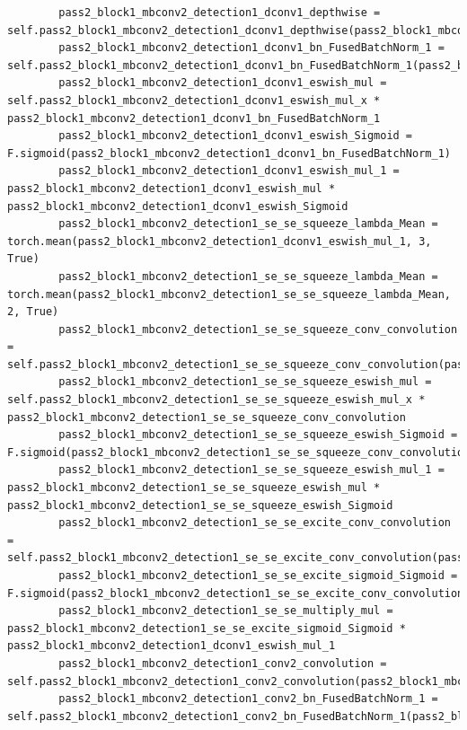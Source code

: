 \documentclass{fisatprojectfinal}
\begin{document}
\begin{appendices}
\begin{lstlisting}
        pass2_block1_mbconv2_detection1_dconv1_depthwise = self.pass2_block1_mbconv2_detection1_dconv1_depthwise(pass2_block1_mbconv2_detection1_dconv1_depthwise_pad)
        pass2_block1_mbconv2_detection1_dconv1_bn_FusedBatchNorm_1 = self.pass2_block1_mbconv2_detection1_dconv1_bn_FusedBatchNorm_1(pass2_block1_mbconv2_detection1_dconv1_depthwise)
        pass2_block1_mbconv2_detection1_dconv1_eswish_mul = self.pass2_block1_mbconv2_detection1_dconv1_eswish_mul_x * pass2_block1_mbconv2_detection1_dconv1_bn_FusedBatchNorm_1
        pass2_block1_mbconv2_detection1_dconv1_eswish_Sigmoid = F.sigmoid(pass2_block1_mbconv2_detection1_dconv1_bn_FusedBatchNorm_1)
        pass2_block1_mbconv2_detection1_dconv1_eswish_mul_1 = pass2_block1_mbconv2_detection1_dconv1_eswish_mul * pass2_block1_mbconv2_detection1_dconv1_eswish_Sigmoid
        pass2_block1_mbconv2_detection1_se_se_squeeze_lambda_Mean = torch.mean(pass2_block1_mbconv2_detection1_dconv1_eswish_mul_1, 3, True)
        pass2_block1_mbconv2_detection1_se_se_squeeze_lambda_Mean = torch.mean(pass2_block1_mbconv2_detection1_se_se_squeeze_lambda_Mean, 2, True)
        pass2_block1_mbconv2_detection1_se_se_squeeze_conv_convolution = self.pass2_block1_mbconv2_detection1_se_se_squeeze_conv_convolution(pass2_block1_mbconv2_detection1_se_se_squeeze_lambda_Mean)
        pass2_block1_mbconv2_detection1_se_se_squeeze_eswish_mul = self.pass2_block1_mbconv2_detection1_se_se_squeeze_eswish_mul_x * pass2_block1_mbconv2_detection1_se_se_squeeze_conv_convolution
        pass2_block1_mbconv2_detection1_se_se_squeeze_eswish_Sigmoid = F.sigmoid(pass2_block1_mbconv2_detection1_se_se_squeeze_conv_convolution)
        pass2_block1_mbconv2_detection1_se_se_squeeze_eswish_mul_1 = pass2_block1_mbconv2_detection1_se_se_squeeze_eswish_mul * pass2_block1_mbconv2_detection1_se_se_squeeze_eswish_Sigmoid
        pass2_block1_mbconv2_detection1_se_se_excite_conv_convolution = self.pass2_block1_mbconv2_detection1_se_se_excite_conv_convolution(pass2_block1_mbconv2_detection1_se_se_squeeze_eswish_mul_1)
        pass2_block1_mbconv2_detection1_se_se_excite_sigmoid_Sigmoid = F.sigmoid(pass2_block1_mbconv2_detection1_se_se_excite_conv_convolution)
        pass2_block1_mbconv2_detection1_se_se_multiply_mul = pass2_block1_mbconv2_detection1_se_se_excite_sigmoid_Sigmoid * pass2_block1_mbconv2_detection1_dconv1_eswish_mul_1
        pass2_block1_mbconv2_detection1_conv2_convolution = self.pass2_block1_mbconv2_detection1_conv2_convolution(pass2_block1_mbconv2_detection1_se_se_multiply_mul)
        pass2_block1_mbconv2_detection1_conv2_bn_FusedBatchNorm_1 = self.pass2_block1_mbconv2_detection1_conv2_bn_FusedBatchNorm_1(pass2_block1_mbconv2_detection1_conv2_convolution)

\end{lstlisting}
\end{appendices}
\end{document}
